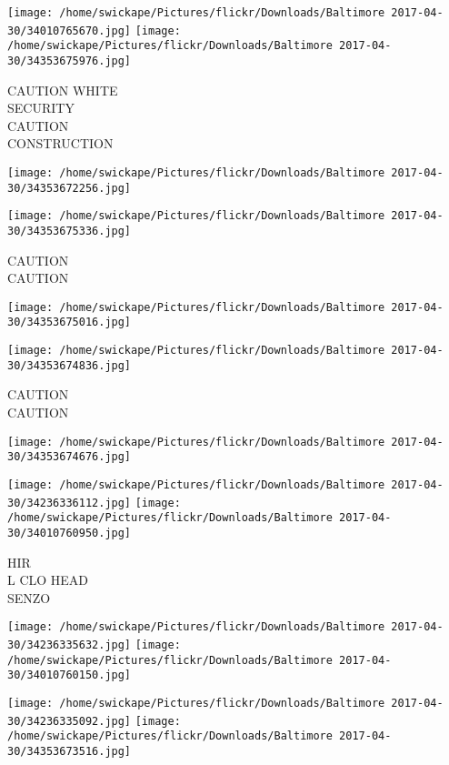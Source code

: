 \documentclass[10pt,letterpaper]{article}
\begin{document}
\texttt{[image: /home/swickape/Pictures/flickr/Downloads/Baltimore 2017-04-30/34010765670.jpg]}
\texttt{[image: /home/swickape/Pictures/flickr/Downloads/Baltimore 2017-04-30/34353675976.jpg]}

CAUTION WHITE\\
SECURITY\\
CAUTION\\
CONSTRUCTION\\
\pagebreak

\texttt{[image: /home/swickape/Pictures/flickr/Downloads/Baltimore 2017-04-30/34353672256.jpg]}

\vspace{0.25in}
\texttt{[image: /home/swickape/Pictures/flickr/Downloads/Baltimore 2017-04-30/34353675336.jpg]}

CAUTION\\
CAUTION\\
\pagebreak

\texttt{[image: /home/swickape/Pictures/flickr/Downloads/Baltimore 2017-04-30/34353675016.jpg]}

\vspace{0.25in}
\texttt{[image: /home/swickape/Pictures/flickr/Downloads/Baltimore 2017-04-30/34353674836.jpg]}

CAUTION\\
CAUTION\\
\pagebreak

\texttt{[image: /home/swickape/Pictures/flickr/Downloads/Baltimore 2017-04-30/34353674676.jpg]}

\vspace{0.25in}
\texttt{[image: /home/swickape/Pictures/flickr/Downloads/Baltimore 2017-04-30/34236336112.jpg]}
\texttt{[image: /home/swickape/Pictures/flickr/Downloads/Baltimore 2017-04-30/34010760950.jpg]}

HIR\\
L CLO HEAD\\
SENZO\\
\pagebreak

\texttt{[image: /home/swickape/Pictures/flickr/Downloads/Baltimore 2017-04-30/34236335632.jpg]}
\texttt{[image: /home/swickape/Pictures/flickr/Downloads/Baltimore 2017-04-30/34010760150.jpg]}

\texttt{[image: /home/swickape/Pictures/flickr/Downloads/Baltimore 2017-04-30/34236335092.jpg]}
\texttt{[image: /home/swickape/Pictures/flickr/Downloads/Baltimore 2017-04-30/34353673516.jpg]}
\end{document}
